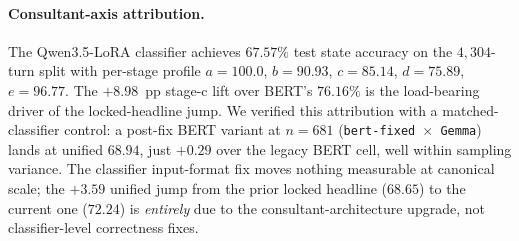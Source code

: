 \documentclass[11pt]{article}
\begin{document}
\begin{table}[t]
  \centering
  \small
  \caption{Canonical-scale ($n{=}681$) leaderboard. Unified score per Eq.~\ref{eq:unified}. Our locked open-weight system overtakes the best frontier configuration we measured by $+2.18$ unified points at $0$~USD per-run eval cost (vs.\ $\approx \$5$/run for Sonnet, $\approx \$8$/run for Opus), and outscores the canonical GPT-4o + SocratTeachLLM baseline by $\mathbf{+19.25}$ unified points (1.36$\times$) under the memorization-resistant ranking.}
  \label{tab:headline}
\end{table}

\paragraph{Consultant-axis attribution.} The Qwen3.5-LoRA classifier achieves $67.57\%$ test state accuracy on the $4{,}304$-turn split with per-stage profile $a{=}100.0$, $b{=}90.93$, $c{=}\mathbf{85.14}$, $d{=}75.89$, $e{=}96.77$. The $+8.98$~pp stage-c lift over BERT's $76.16\%$ is the load-bearing driver of the locked-headline jump. We verified this attribution with a matched-classifier control: a post-fix BERT variant at $n{=}681$ (\texttt{bert-fixed $\times$ Gemma}) lands at unified $68.94$, just $+0.29$ over the legacy BERT cell, well within sampling variance. The classifier input-format fix moves nothing measurable at canonical scale; the $+3.59$ unified jump from the prior locked headline ($68.65$) to the current one ($72.24$) is \emph{entirely} due to the consultant-architecture upgrade, not classifier-level correctness fixes.
\end{document}
